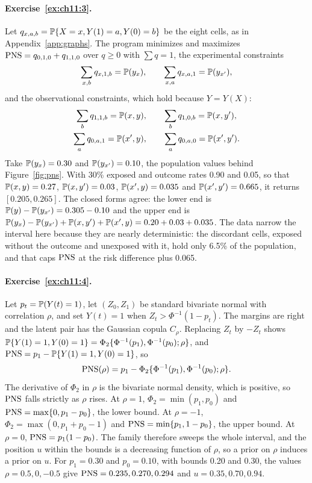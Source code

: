 \paragraph{Exercise~\ref{ex:ch11:3}.} Let $q_{x,a,b} = \mathbb{P}\{X = x, Y(1) = a, Y(0) = b\}$ be the eight cells, as in Appendix~\ref{app:graphs}. The program minimizes and maximizes $\mathrm{PNS} = q_{0,1,0} + q_{1,1,0}$ over $q \geq 0$ with $\sum q = 1$, the experimental constraints
\[
\sum_{x,b} q_{x,1,b} = \mathbb{P}(y_x), \qquad \sum_{x,a} q_{x,a,1} = \mathbb{P}(y_{x'}),
\]
and the observational constraints, which hold because $Y = Y(X)$:
\begin{gather*}
\sum_b q_{1,1,b} = \mathbb{P}(x, y), \qquad \sum_b q_{1,0,b} = \mathbb{P}(x, y'), \\
\sum_a q_{0,a,1} = \mathbb{P}(x', y), \qquad \sum_a q_{0,a,0} = \mathbb{P}(x', y').
\end{gather*}
Take $\mathbb{P}(y_x) = 0.30$ and $\mathbb{P}(y_{x'}) = 0.10$, the population values behind Figure~\ref{fig:pns}.  With 30\% exposed and outcome rates 0.90 and 0.05, so that $\mathbb{P}(x, y) = 0.27$, $\mathbb{P}(x, y') = 0.03$, $\mathbb{P}(x', y) = 0.035$ and $\mathbb{P}(x', y') = 0.665$, it returns $[0.205, 0.265]$. The closed forms agree: the lower end is $\mathbb{P}(y) - \mathbb{P}(y_{x'}) = 0.305 - 0.10$ and the upper end is $\mathbb{P}(y_x) - \mathbb{P}(y_{x'}) + \mathbb{P}(x, y') + \mathbb{P}(x', y) = 0.20 + 0.03 + 0.035$. The data narrow the interval here because they are nearly deterministic: the discordant cells, exposed without the outcome and unexposed with it, hold only 6.5\% of the population, and that caps $\mathrm{PNS}$ at the risk difference plus 0.065.

\paragraph{Exercise~\ref{ex:ch11:4}.} Let $p_t = \mathbb{P}(Y(t) = 1)$, let $(Z_0, Z_1)$ be standard bivariate normal with correlation $\rho$, and set $Y(t) = 1$ when $Z_t > \Phi^{-1}(1 - p_t)$. The margins are right and the latent pair has the Gaussian copula $C_\rho$. Replacing $Z_t$ by $-Z_t$ shows $\mathbb{P}\{Y(1) = 1, Y(0) = 1\} = \Phi_2\{\Phi^{-1}(p_1), \Phi^{-1}(p_0); \rho\}$, and $\mathrm{PNS} = p_1 - \mathbb{P}\{Y(1) = 1, Y(0) = 1\}$, so
\[
\mathrm{PNS}(\rho) = p_1 - \Phi_2\{\Phi^{-1}(p_1), \Phi^{-1}(p_0); \rho\}.
\]
The derivative of $\Phi_2$ in $\rho$ is the bivariate normal density, which is positive, so $\mathrm{PNS}$ falls strictly as $\rho$ rises. At $\rho = 1$, $\Phi_2 = \min(p_1, p_0)$ and $\mathrm{PNS} = \max\{0, p_1 - p_0\}$, the lower bound. At $\rho = -1$, $\Phi_2 = \max(0, p_1 + p_0 - 1)$ and $\mathrm{PNS} = \min\{p_1, 1 - p_0\}$, the upper bound. At $\rho = 0$, $\mathrm{PNS} = p_1(1 - p_0)$. The family therefore sweeps the whole interval, and the position $u$ within the bounds is a decreasing function of $\rho$, so a prior on $\rho$ induces a prior on $u$. For $p_1 = 0.30$ and $p_0 = 0.10$, with bounds 0.20 and 0.30, the values $\rho = 0.5, 0, -0.5$ give $\mathrm{PNS} = 0.235, 0.270, 0.294$ and $u = 0.35, 0.70, 0.94$.

